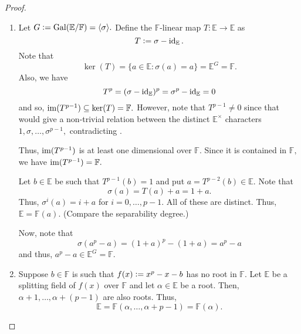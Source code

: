 \artinschreier*\label{thm:artinschreier2}
\begin{flushright}\hyperref[thm:artinschreier]{\upsym}\end{flushright}
\begin{proof}
    \phantom{hi}
    \begin{enumerate}
        \item Let $G \vcentcolon= \operatorname{Gal}(\mathbb{E}/\mathbb{F}) = \langle \sigma\rangle.$ Define the $\mathbb{F}$-linear map $T : \mathbb{E} \to \mathbb{E}$ as 
        \begin{equation*} 
            T \vcentcolon= \sigma - \operatorname{id}_{\mathbb{E}}.
        \end{equation*}
        Note that
        \begin{equation*} 
            \ker(T) = \{a \in \mathbb{E} : \sigma(a) = a\} = \mathbb{E}^G = \mathbb{F}.
        \end{equation*}
        Also, we have
        \begin{equation*} 
            T^p = (\sigma - \operatorname{id}_{\mathbb{E}})^p = \sigma^p - \operatorname{id}_{\mathbb{E}} = 0
        \end{equation*}
        and so, $\operatorname{im}(T^{p - 1}) \subseteq \ker(T) = \mathbb{F}.$ However, note that $T^{p - 1} \neq 0$ since that would give a non-trivial relation between the distinct $\mathbb{E}^\times$ characters $1, \sigma, \ldots, \sigma^{p - 1},$ contradicting .

        Thus, $\operatorname{im}(T^{p - 1})$ is at least one dimensional over $\mathbb{F}.$ Since it is contained in $\mathbb{F},$ we have $\operatorname{im}(T^{p - 1}) = \mathbb{F}.$

        Let $b \in \mathbb{E}$ be such that $T^{p - 1}(b) = 1$ and put $a = T^{p - 2}(b) \in \mathbb{E}.$ Note that
        \begin{equation*} 
            \sigma(a) = T(a) + a = 1 + a.
        \end{equation*}
        Thus, $\sigma^i(a) = i + a$ for $i = 0, \ldots, p - 1.$ All of these are distinct. Thus, $\mathbb{E} = \mathbb{F}(a).$ (Compare the separability degree.)

        Now, note that
        \begin{equation*} 
            \sigma(a^p - a) = (1 + a)^p - (1 + a) = a^p - a
        \end{equation*}
        and thus, $a^p - a \in \mathbb{E}^G = \mathbb{F}.$
        \item Suppose $b \in \mathbb{F}$ is such that $f(x) \vcentcolon= x^p - x - b$ has no root in $\mathbb{F}.$ Let $\mathbb{E}$ be a splitting field of $f(x)$ over $\mathbb{F}$ and let $\alpha \in \mathbb{E}$ be a root. Then, $\alpha + 1, \ldots, \alpha + (p - 1)$ are also roots. Thus,
        \begin{equation*} 
            \mathbb{E} = \mathbb{F}(\alpha, \ldots, \alpha + p - 1) = \mathbb{F}(\alpha).
        \end{equation*}


\end{enumerate}
\end{proof}
